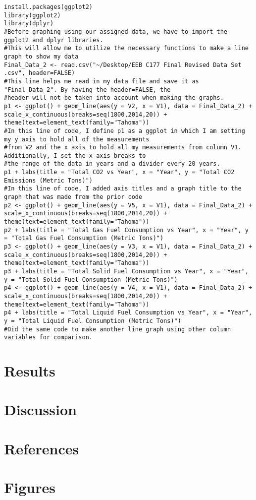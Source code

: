 \documentclass[letterpaper]{article}
\begin{document}
\lstset{language=R}
\begin{lstlisting}[frame=single]   
install.packages(ggplot2)
library(ggplot2)
library(dplyr)
#Before graphing using our assigned data, we have to import the ggplot2 and dplyr libraries.
#This will allow me to utilize the necessary functions to make a line graph to show my data
Final_Data_2 <- read.csv("~/Desktop/EEB C177 Final Revised Data Set .csv", header=FALSE)
#This line helps me read in my data file and save it as "Final_Data_2". By having the header=FALSE, the 
#header will not be taken into account when making the graphs. 
p1 <- ggplot() + geom_line(aes(y = V2, x = V1), data = Final_Data_2) + scale_x_continuous(breaks=seq(1800,2014,20)) + theme(text=element_text(family="Tahoma"))
#In this line of code, I define p1 as a ggplot in which I am setting my y axis to hold all of the measurements 
#from V2 and the x axis to hold all my measurements from column V1. Additionally, I set the x axis breaks to 
#the range of the data in years and a divider every 20 years. 
p1 + labs(title = "Total CO2 vs Year", x = "Year", y = "Total CO2 Emissions (Metric Tons)")
#In this line of code, I added axis titles and a graph title to the graph that was made from the prior code 
p2 <- ggplot() + geom_line(aes(y = V5, x = V1), data = Final_Data_2) + scale_x_continuous(breaks=seq(1800,2014,20)) + theme(text=element_text(family="Tahoma"))
p2 + labs(title = "Total Gas Fuel Consumption vs Year", x = "Year", y = "Total Gas Fuel Consumption (Metric Tons)")
p3 <- ggplot() + geom_line(aes(y = V3, x = V1), data = Final_Data_2) + scale_x_continuous(breaks=seq(1800,2014,20)) + theme(text=element_text(family="Tahoma"))
p3 + labs(title = "Total Solid Fuel Consumption vs Year", x = "Year", y = "Total Solid Fuel Consumption (Metric Tons)")
p4 <- ggplot() + geom_line(aes(y = V4, x = V1), data = Final_Data_2) + scale_x_continuous(breaks=seq(1800,2014,20)) + theme(text=element_text(family="Tahoma"))
p4 + labs(title = "Total Liquid Fuel Consumption vs Year", x = "Year", y = "Total Liquid Fuel Consumption (Metric Tons)")
#Did the same code to make another line graph using other column variables for comparison. 

\end{lstlisting}

\section{Results}

\section{Discussion}

\section{References}

\section{Figures}
\end{document}
